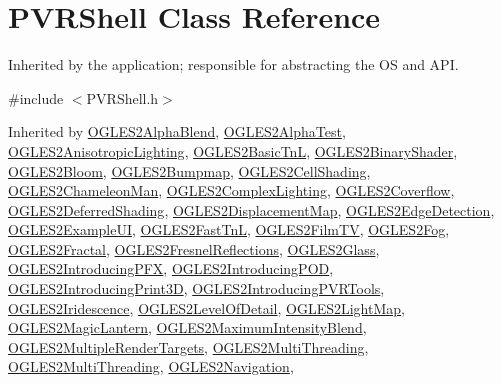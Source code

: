 \hypertarget{class_p_v_r_shell}{\section{P\+V\+R\+Shell Class Reference}
\label{class_p_v_r_shell}
}


Inherited by the application; responsible for abstracting the O\+S and A\+P\+I.  




{\ttfamily \#include $<$P\+V\+R\+Shell.\+h$>$}



Inherited by \hyperlink{class_o_g_l_e_s2_alpha_blend}{O\+G\+L\+E\+S2\+Alpha\+Blend}, \hyperlink{class_o_g_l_e_s2_alpha_test}{O\+G\+L\+E\+S2\+Alpha\+Test}, \hyperlink{class_o_g_l_e_s2_anisotropic_lighting}{O\+G\+L\+E\+S2\+Anisotropic\+Lighting}, \hyperlink{class_o_g_l_e_s2_basic_tn_l}{O\+G\+L\+E\+S2\+Basic\+Tn\+L}, \hyperlink{class_o_g_l_e_s2_binary_shader}{O\+G\+L\+E\+S2\+Binary\+Shader}, \hyperlink{class_o_g_l_e_s2_bloom}{O\+G\+L\+E\+S2\+Bloom}, \hyperlink{class_o_g_l_e_s2_bumpmap}{O\+G\+L\+E\+S2\+Bumpmap}, \hyperlink{class_o_g_l_e_s2_cell_shading}{O\+G\+L\+E\+S2\+Cell\+Shading}, \hyperlink{class_o_g_l_e_s2_chameleon_man}{O\+G\+L\+E\+S2\+Chameleon\+Man}, \hyperlink{class_o_g_l_e_s2_complex_lighting}{O\+G\+L\+E\+S2\+Complex\+Lighting}, \hyperlink{class_o_g_l_e_s2_coverflow}{O\+G\+L\+E\+S2\+Coverflow}, \hyperlink{class_o_g_l_e_s2_deferred_shading}{O\+G\+L\+E\+S2\+Deferred\+Shading}, \hyperlink{class_o_g_l_e_s2_displacement_map}{O\+G\+L\+E\+S2\+Displacement\+Map}, \hyperlink{class_o_g_l_e_s2_edge_detection}{O\+G\+L\+E\+S2\+Edge\+Detection}, \hyperlink{class_o_g_l_e_s2_example_u_i}{O\+G\+L\+E\+S2\+Example\+U\+I}, \hyperlink{class_o_g_l_e_s2_fast_tn_l}{O\+G\+L\+E\+S2\+Fast\+Tn\+L}, \hyperlink{class_o_g_l_e_s2_film_t_v}{O\+G\+L\+E\+S2\+Film\+T\+V}, \hyperlink{class_o_g_l_e_s2_fog}{O\+G\+L\+E\+S2\+Fog}, \hyperlink{class_o_g_l_e_s2_fractal}{O\+G\+L\+E\+S2\+Fractal}, \hyperlink{class_o_g_l_e_s2_fresnel_reflections}{O\+G\+L\+E\+S2\+Fresnel\+Reflections}, \hyperlink{class_o_g_l_e_s2_glass}{O\+G\+L\+E\+S2\+Glass}, \hyperlink{class_o_g_l_e_s2_introducing_p_f_x}{O\+G\+L\+E\+S2\+Introducing\+P\+F\+X}, \hyperlink{class_o_g_l_e_s2_introducing_p_o_d}{O\+G\+L\+E\+S2\+Introducing\+P\+O\+D}, \hyperlink{class_o_g_l_e_s2_introducing_print3_d}{O\+G\+L\+E\+S2\+Introducing\+Print3\+D}, \hyperlink{class_o_g_l_e_s2_introducing_p_v_r_tools}{O\+G\+L\+E\+S2\+Introducing\+P\+V\+R\+Tools}, \hyperlink{class_o_g_l_e_s2_iridescence}{O\+G\+L\+E\+S2\+Iridescence}, \hyperlink{class_o_g_l_e_s2_level_of_detail}{O\+G\+L\+E\+S2\+Level\+Of\+Detail}, \hyperlink{class_o_g_l_e_s2_light_map}{O\+G\+L\+E\+S2\+Light\+Map}, \hyperlink{class_o_g_l_e_s2_magic_lantern}{O\+G\+L\+E\+S2\+Magic\+Lantern}, \hyperlink{class_o_g_l_e_s2_maximum_intensity_blend}{O\+G\+L\+E\+S2\+Maximum\+Intensity\+Blend}, \hyperlink{class_o_g_l_e_s2_multiple_render_targets}{O\+G\+L\+E\+S2\+Multiple\+Render\+Targets}, \hyperlink{class_o_g_l_e_s2_multi_threading}{O\+G\+L\+E\+S2\+Multi\+Threading}, \hyperlink{class_o_g_l_e_s2_multi_threading}{O\+G\+L\+E\+S2\+Multi\+Threading}, \hyperlink{class_o_g_l_e_s2_navigation}{O\+G\+L\+E\+S2\+Navigation}, 